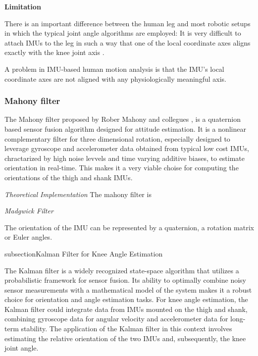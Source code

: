 

\textbf{Limitation}

There is an important difference between the human leg and most robotic setups in which the typical joint angle algorithms are employed: It is very difficult to attach IMUs to the leg in such a way that one of the local coordinate axes aligns exactly with the knee joint axis \cite{seel_imu-based_2014}. 

A problem in IMU-based human motion analysis is that the IMU's local coordinate axes are not aligned with any physiologically meaningful axis.



\subsubsection{Mahony filter}

The Mahony filter proposed by Rober Mahony and collegues \cite{mahony_nonlinear_2008}, is a quaternion based sensor fusion algorithm designed for attitude estimation. It is a nonlinear complementary filter for three dimensional rotation, especially designed to leverage gyroscope and accelerometer data obtained from typical low cost IMUs, chractarized by high noise levvels and time varying additive biases, to estimate orientation in real-time. This makes it a very viable choise for computing the orientations of the thigh and shank IMUs.


\textit{Theoretical Implementation}
The mahony filter is 






\textit{Madgwick Filter}


The orientation of the IMU can be represented by a quaternion, a rotation matrix or Euler angles. 

subsection{Kalman Filter for Knee Angle Estimation}

The Kalman filter is a widely recognized state-space algorithm that utilizes a probabilistic framework for sensor fusion. Its ability to optimally combine noisy sensor measurements with a mathematical model of the system makes it a robust choice for orientation and angle estimation tasks. For knee angle estimation, the Kalman filter could integrate data from IMUs mounted on the thigh and shank, combining gyroscope data for angular velocity and accelerometer data for long-term stability. The application of the Kalman filter in this context involves estimating the relative orientation of the two IMUs and, subsequently, the knee joint angle.

